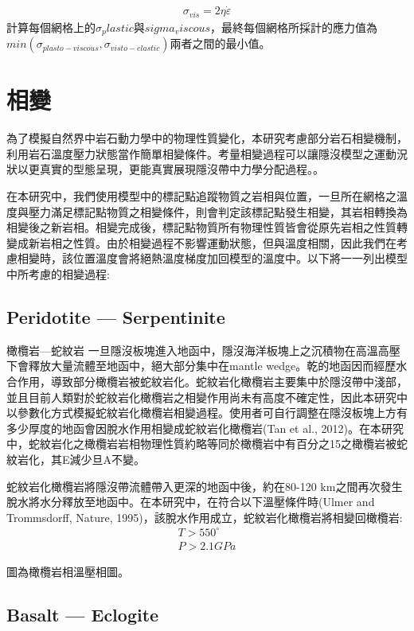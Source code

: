 \begin{align}
    \sigma_{vis} = 2\eta\dot\varepsilon \label{eqn:viscous tensor}
\end{align}
計算每個網格上的$\sigma_plastic$與$sigma_viscous$，最終每個網格所採計的應力值為$min(\sigma_{plasto-viscous}, \sigma_{visto-elastic})$兩者之間的最小值。
\section{相變}

為了模擬自然界中岩石動力學中的物理性質變化，本研究考慮部分岩石相變機制，利用岩石溫度壓力狀態當作簡單相變條件。考量相變過程可以讓隱沒模型之運動況狀以更真實的型態呈現，更能真實展現隱沒帶中力學分配過程。。

在本研究中，我們使用模型中的標記點追蹤物質之岩相與位置，一旦所在網格之溫度與壓力滿足標記點物質之相變條件，則會判定該標記點發生相變，其岩相轉換為相變後之新岩相。相變完成後，標記點物質所有物理性質皆會從原先岩相之性質轉變成新岩相之性質。由於相變過程不影響運動狀態，但與溫度相關，因此我們在考慮相變時，該位置溫度會將絕熱溫度梯度加回模型的溫度中。以下將一一列出模型中所考慮的相變過程:

\subsection{Peridotite --- Serpentinite}
橄欖岩---蛇紋岩
一旦隱沒板塊進入地函中，隱沒海洋板塊上之沉積物在高溫高壓下會釋放大量流體至地函中，絕大部分集中在mantle wedge。乾的地函因而經歷水合作用，導致部分橄欖岩被蛇紋岩化。蛇紋岩化橄欖岩主要集中於隱沒帶中淺部，並且目前人類對於蛇紋岩化橄欖岩之相變作用尚未有高度不確定性，因此本研究中以參數化方式模擬蛇紋岩化橄欖岩相變過程。使用者可自行調整在隱沒板塊上方有多少厚度的地函會因脫水作用相變成蛇紋岩化橄欖岩(Tan et al., 2012)。在本研究中，蛇紋岩化之橄欖岩岩相物理性質約略等同於橄欖岩中有百分之15之橄欖岩被蛇紋岩化，其E減少旦A不變。
   
蛇紋岩化橄欖岩將隱沒帶流體帶入更深的地函中後，約在80-120 km之間再次發生脫水將水分釋放至地函中。在本研究中，在符合以下溫壓條件時(Ulmer and Trommsdorff, Nature, 1995)，該脫水作用成立，蛇紋岩化橄欖岩將相變回橄欖岩:
\begin{align}
T> 550 ^{\circ}\\
P > 2.1 GPa
\end{align}

圖為橄欖岩相溫壓相圖。

\subsection{Basalt --- Eclogite}

